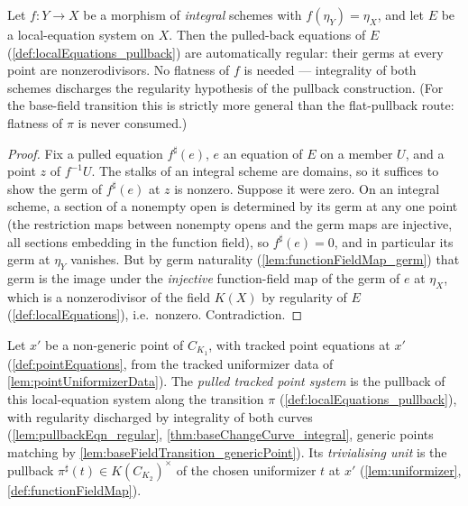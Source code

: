 \begin{lemma}
  \label{lem:pullbackEqn_regular}
  \leanok
  Let \(f : Y \to X\) be a morphism of \emph{integral} schemes with
  \(f(\eta_Y) = \eta_X\), and let \(E\) be a local-equation system on \(X\). Then the
  pulled-back equations of \(E\) (\ref{def:localEquations_pullback}) are automatically
  regular: their germs at every point are nonzerodivisors. No flatness of \(f\) is
  needed --- integrality of both schemes discharges the regularity hypothesis of the
  pullback construction. (For the base-field transition this is strictly more general
  than the flat-pullback route: flatness of \(\pi\) is never consumed.)
\end{lemma}
\begin{proof}
  \leanok
  Fix a pulled equation \(f^{\sharp}(e)\), \(e\) an equation of \(E\) on a member
  \(U\), and a point \(z\) of \(f^{-1}U\). The stalks of an integral scheme are
  domains, so it suffices to show the germ of \(f^{\sharp}(e)\) at \(z\) is nonzero.
  Suppose it were zero. On an integral scheme, a section of a nonempty open is
  determined by its germ at any one point (the restriction maps between nonempty opens
  and the germ maps are injective, all sections embedding in the function field), so
  \(f^{\sharp}(e) = 0\), and in particular its germ at \(\eta_Y\) vanishes. But by
  germ naturality (\ref{lem:functionFieldMap_germ}) that germ is the image under the
  \emph{injective} function-field map of the germ of \(e\) at \(\eta_X\), which is a
  nonzerodivisor of the field \(K(X)\) by regularity of \(E\)
  (\ref{def:localEquations}), i.e.\ nonzero. Contradiction.
\end{proof}

\begin{definition}
  \label{def:pointTransitionEquations}
  \leanok
  Let \(x'\) be a non-generic point of \(C_{K_1}\), with tracked point equations at
  \(x'\) (\ref{def:pointEquations}, from the tracked uniformizer data of
  \ref{lem:pointUniformizerData}). The \emph{pulled tracked point system} is the
  pullback of this local-equation system along the transition \(\pi\)
  (\ref{def:localEquations_pullback}), with regularity discharged by integrality of
  both curves (\ref{lem:pullbackEqn_regular}, \ref{thm:baseChangeCurve_integral},
  generic points matching by \ref{lem:baseFieldTransition_genericPoint}). Its
  \emph{trivialising unit} is the pullback
  \(\pi^{\sharp}(t) \in K(C_{K_2})^{\times}\) of the chosen uniformizer \(t\) at
  \(x'\) (\ref{lem:uniformizer}, \ref{def:functionFieldMap}).
\end{definition}

